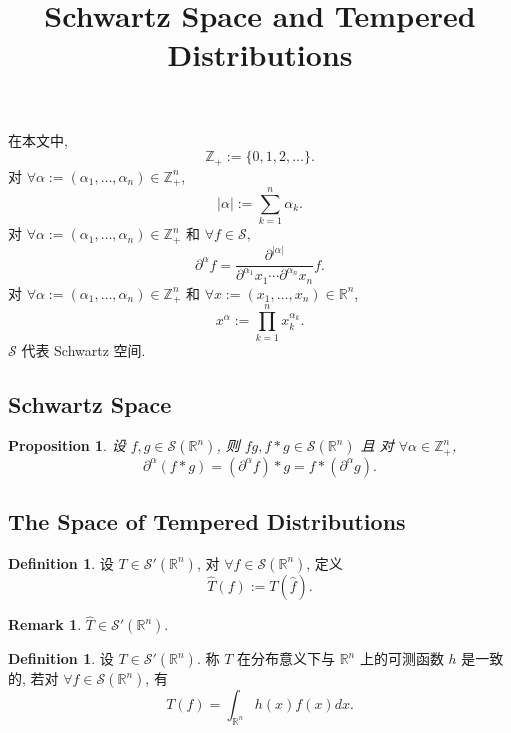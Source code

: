 \documentclass[a4paper,11pt]{article}
\title{Schwartz Space and Tempered Distributions}
\newtheorem{proposition}[theorem]{Proposition}
\theoremstyle{definition}
\newtheorem{remark}[theorem]{Remark}
\newtheorem{definition}[theorem]{Definition}
\begin{document}
\begin{CJK*}{UTF8}{gbsn}

\maketitle

在本文中, 
$$ 
    \mathbb{Z}_+ := \{0, 1, 2, \ldots\}.
$$
对 $ \forall \alpha := (\alpha_1, \ldots, \alpha_n) \in \mathbb{Z}_+^n $,
$$
    |\alpha| := \sum_{k = 1}^n \alpha_k.
$$
对 $ \forall \alpha := (\alpha_1, \ldots, \alpha_n) \in \mathbb{Z}_+^n $ 
和 $ \forall f \in \mathcal{S} $,
$$
    \partial^\alpha f = \frac{\partial^{|\alpha|}}{\partial^{\alpha_1} x_1 \cdots \partial^{\alpha_n} x_n} f.
$$
对 $ \forall \alpha := (\alpha_1, \ldots, \alpha_n) \in \mathbb{Z}_+^n $ 
和 $ \forall x := (x_1, \ldots, x_n) \in \mathbb{R}^n $,
$$
    x^\alpha := \prod_{k = 1}^n x_k^{\alpha_k}.
$$ 
$ \mathcal{S} $ 代表 Schwartz 空间.

\subsection{Schwartz Space}

\begin{proposition}
    设 $ f, g \in \mathcal{S}(\mathbb{R}^n) $, 则 $ f g, f * g \in \mathcal{S}(\mathbb{R}^n) $ 且
    对 $ \forall \alpha \in \mathbb{Z}_+^n $,
    $$
        \partial^\alpha (f * g) =  (\partial^\alpha f) * g = f * (\partial^\alpha g).
    $$
\end{proposition}

\subsection{The Space of Tempered Distributions}

\begin{definition}
    设 $ T \in \mathcal{S}'(\mathbb{R}^n) $, 对 $ \forall f \in \mathcal{S}(\mathbb{R}^n) $, 定义
    $$
        \widehat{T}(f) := T(\hat{f}).
    $$
\end{definition}

\begin{remark}
     $ \widehat{T} \in \mathcal{S}'(\mathbb{R}^n) $.
\end{remark}

\begin{definition}
    设 $ T \in \mathcal{S}'(\mathbb{R}^n) $. 称 $ T $ 在分布意义下与 $ \mathbb{R}^n $ 上的可测函数 $ h $ 是一致的, 
    若对 $ \forall f \in \mathcal{S}(\mathbb{R}^n) $, 有
    $$
        T(f) = \int_{\mathbb{R}^n} h(x) f(x) dx.
    $$
\end{definition}


\end{CJK*}
\end{document}
